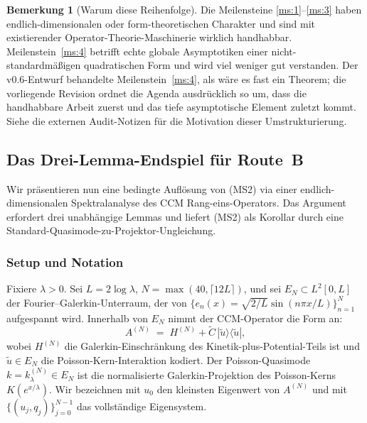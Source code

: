 \documentclass[11pt,a4paper]{article}
\theoremstyle{plain}
\theoremstyle{definition}
\newtheorem{remark}[theorem]{Bemerkung}
\begin{document}
\begin{remark}[Warum diese Reihenfolge]
\label{rem:milestone-ordering}
Die Meilensteine \ref{ms:1}--\ref{ms:3} haben endlich-dimensionalen oder
form-theoretischen Charakter und sind mit existierender Operator-Theorie-Maschinerie
wirklich handhabbar. Meilenstein~\ref{ms:4} betrifft echte globale Asymptotiken
einer nicht-standardmäßigen quadratischen Form und wird viel weniger
gut verstanden. Der v0.6-Entwurf behandelte Meilenstein~\ref{ms:4}, als
wäre es fast ein Theorem; die vorliegende Revision ordnet die Agenda
ausdrücklich so um, dass die handhabbare Arbeit zuerst und das tiefe asymptotische
Element zuletzt kommt. Siehe die externen Audit-Notizen für die Motivation dieser
Umstrukturierung.
\end{remark}

\subsection{Das Drei-Lemma-Endspiel für Route~B}
\label{sec:three-lemma-endgame}

Wir präsentieren nun eine bedingte Auflösung von (MS2) via einer
endlich-dimensionalen Spektralanalyse des CCM Rang-eins-Operators.
Das Argument erfordert drei unabhängige Lemmas und liefert (MS2) als
Korollar durch eine Standard-Quasimode-zu-Projektor-Ungleichung.

\subsubsection{Setup und Notation}

Fixiere $\lambda > 0$. Sei $L = 2\log\lambda$, $N = \max(40,
\lceil 12L \rceil)$, und sei $E_N \subset L^2[0,L]$ der Fourier--Galerkin-Unterraum,
der von $\{e_n(x) = \sqrt{2/L} \sin(n\pi x/L)\}_{n=1}^N$ aufgespannt wird. Innerhalb
von $E_N$ nimmt der CCM-Operator die Form an:
\begin{equation}\label{eq:rank-one-structure}
  A^{(N)} \;=\; H^{(N)} + \tilde{C}\,|\tilde{u}\rangle\langle\tilde{u}|,
\end{equation}
wobei $H^{(N)}$ die Galerkin-Einschränkung des Kinetik-plus-Potential-Teils ist
und $\tilde{u} \in E_N$ die Poisson-Kern-Interaktion kodiert.
Der Poisson-Quasimode $k = k_\lambda^{(N)} \in E_N$ ist die normalisierte
Galerkin-Projektion des Poisson-Kerns $K(e^{x/\lambda})$.
Wir bezeichnen mit $u_0$ den kleinsten Eigenwert von $A^{(N)}$ und
mit $\{(u_j, q_j)\}_{j=0}^{N-1}$ das vollständige Eigensystem.
\end{document}
